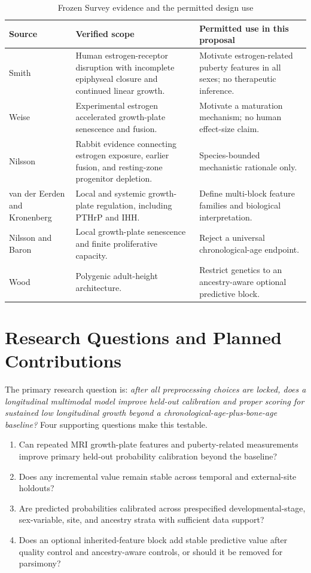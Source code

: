 \documentclass[conference]{IEEEtran}
\begin{document}
\begin{table}[t]
\caption{Frozen Survey evidence and the permitted design use}
\label{tab:evidence}
\centering
\footnotesize
\begin{tabular}{p{}p{}p{}}
\toprule
Source & Verified scope & Permitted use in this proposal \\
\midrule
Smith \cite{smith1994} & Human estrogen-receptor disruption with incomplete epiphyseal closure and continued linear growth. & Motivate estrogen-related puberty features in all sexes; no therapeutic inference. \\
Weise \cite{weise2001} & Experimental estrogen accelerated growth-plate senescence and fusion. & Motivate a maturation mechanism; no human effect-size claim. \\
Nilsson \cite{nilsson2014} & Rabbit evidence connecting estrogen exposure, earlier fusion, and resting-zone progenitor depletion. & Species-bounded mechanistic rationale only. \\
van der Eerden and Kronenberg \cite{vanderEerden2003,kronenberg2006} & Local and systemic growth-plate regulation, including PTHrP and IHH. & Define multi-block feature families and biological interpretation. \\
Nilsson and Baron \cite{nilsson2005} & Local growth-plate senescence and finite proliferative capacity. & Reject a universal chronological-age endpoint. \\
Wood \cite{wood2014} & Polygenic adult-height architecture. & Restrict genetics to an ancestry-aware optional predictive block. \\
\bottomrule
\end{tabular}
\end{table}

\section{Research Questions and Planned Contributions}

The primary research question is: \emph{after all preprocessing choices are locked, does a longitudinal multimodal model improve held-out calibration and proper scoring for sustained low longitudinal growth beyond a chronological-age-plus-bone-age baseline?} Four supporting questions make this testable.

\begin{enumerate}
\item Can repeated MRI growth-plate features and puberty-related measurements improve primary held-out probability calibration beyond the baseline?
\item Does any incremental value remain stable across temporal and external-site holdouts?
\item Are predicted probabilities calibrated across prespecified developmental-stage, sex-variable, site, and ancestry strata with sufficient data support?
\item Does an optional inherited-feature block add stable predictive value after quality control and ancestry-aware controls, or should it be removed for parsimony?
\end{enumerate}
\end{document}
